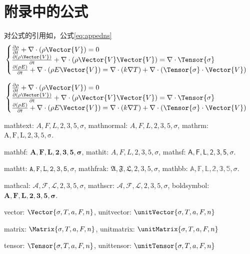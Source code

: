 \thispagestyle{appendixheader}
\setcounter{app_fig}{1}
\setcounter{app_tab}{1}
\setcounter{equation}{0}
\renewcommand\theequation{附\arabic{app}-\arabic{equation}}
\renewcommand\chaptername{附录}
\renewcommand\chaptername{Appendix}
\renewcommand\thechapter{附录\zhnum{app}}

\setcounter{chapter}{0}
\setcounter{section}{0}
\chapter{附录中的公式}\label{chap:app1}{

	对公式的引用如，公式\eqref{eq:appedns}
	\begin{equation} \label{eq:appedns}
		\begin{cases}
			\frac{\partial \rho}{\partial t} + \nabla\cdot(\rho\Vector{V}) = 0                                                \\
			\frac{\partial (\rho\Vector{V})}{\partial t} + \nabla\cdot(\rho\Vector{V}\Vector{V}) = \nabla\cdot\Tensor{\sigma} \\
			\frac{\partial (\rho E)}{\partial t} + \nabla\cdot(\rho E\Vector{V}) = \nabla\cdot(k\nabla T) + \nabla\cdot(\Tensor{\sigma}\cdot\Vector{V})
		\end{cases}
	\end{equation}

	\begin{equation} \label{eq:appedns2}
		\begin{cases}
			\frac{\partial \rho}{\partial t} + \nabla\cdot(\rho\Vector{V}) = 0                                                \\
			\frac{\partial (\rho\Vector{V})}{\partial t} + \nabla\cdot(\rho\Vector{V}\Vector{V}) = \nabla\cdot\Tensor{\sigma} \\
			\frac{\partial (\rho E)}{\partial t} + \nabla\cdot(\rho E\Vector{V}) = \nabla\cdot(k\nabla T) + \nabla\cdot(\Tensor{\sigma}\cdot\Vector{V})
		\end{cases}
	\end{equation}


	mathtext: $A,F,L,2,3,5,\sigma$, mathnormal: $A,F,L,2,3,5,\sigma$, mathrm: $\mathrm{A,F,L,2,3,5,\sigma}$.

	mathbf: $\mathbf{A,F,L,2,3,5,\sigma}$, mathit: $\mathit{A,F,L,2,3,5,\sigma}$, mathsf: $\mathsf{A,F,L,2,3,5,\sigma}$.

	mathtt: $\mathtt{A,F,L,2,3,5,\sigma}$, mathfrak: $\mathfrak{A,F,L,2,3,5,\sigma}$, mathbb: $\mathbb{A,F,L,2,3,5,\sigma}$.

	mathcal: $\mathcal{A,F,L,2,3,5,\sigma}$, mathscr: $\mathscr{A,F,L,2,3,5,\sigma}$, boldsymbol: $\boldsymbol{A,F,L,2,3,5,\sigma}$.

	vector: $\Vector{\sigma, T, a, F, n}$, unitvector: $\unitVector{\sigma, T, a, F, n}$

	matrix: $\Matrix{\sigma, T, a, F, n}$, unitmatrix: $\unitMatrix{\sigma, T, a, F, n}$

	tensor: $\Tensor{\sigma, T, a, F, n}$, unittensor: $\unitTensor{\sigma, T, a, F, n}$


	\thispagestyle{appendixheader}
}
